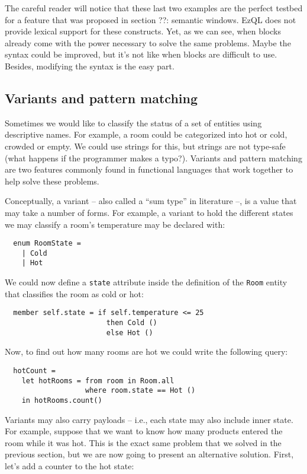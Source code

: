 \documentclass[a4,11pt]{report}
\begin{document}
The careful reader will notice that these last two examples are the
perfect testbed for a feature that was proposed in section ??:
semantic windows. EzQL does not provide lexical support for these
constructs. Yet, as we can see, when blocks already come with the
power necessary to solve the same problems. Maybe the syntax could be
improved, but it's not like when blocks are difficult to use. Besides,
modifying the syntax is the easy part.

\subsection{Variants and pattern matching}

Sometimes we would like to classify the status of a set of entities
using descriptive names. For example, a room could be categorized into
hot or cold, crowded or empty. We could use strings for this, but
strings are not type-safe (what happens if the programmer makes a
typo?). Variants and pattern matching are two features commonly found
in functional languages that work together to help solve these
problems.

Conceptually, a variant -- also called a ``sum type'' in literature
--, is a value that may take a number of forms. For example, a variant
to hold the different states we may classify a room's temperature may
be declared with:

\begin{lstlisting}
  enum RoomState =
    | Cold
    | Hot
\end{lstlisting}

We could now define a \verb=state= attribute inside the definition of
the \verb=Room= entity that classifies the room as cold or hot:

\begin{lstlisting}
  member self.state = if self.temperature <= 25
                        then Cold ()
                        else Hot ()
\end{lstlisting}

Now, to find out how many rooms are hot we could write the following query:

\begin{lstlisting}
  hotCount =
    let hotRooms = from room in Room.all
                   where room.state == Hot ()
    in hotRooms.count()
\end{lstlisting}

Variants may also carry payloads -- i.e., each state may also include
inner state. For example, suppose that we want to know how many
products entered the room while it was hot. This is the exact same
problem that we solved in the previous section, but we are now going
to present an alternative solution. First, let's add a counter to the
hot state:
\end{document}
